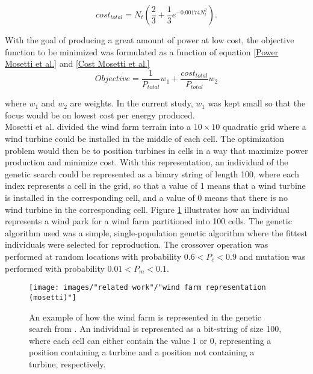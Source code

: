 \begin{equation}
\label{Cost Mosetti et al.}
cost_{total} = N_t \left( \frac{2}{3} + \frac{1}{3}e^{-0.00174N_t^2} \right).
\end{equation}

\noindent With the goal of producing a great amount of power at low cost, the objective function to be minimized was formulated as a function of equation \ref{Power Mosetti et al.} and \ref{Cost Mosetti et al.}\\


\begin{equation}
Objective = \frac{1}{P_{total}}w_1 + \frac{cost_{total}}{P_{total}}w_2
\label{Objective function Mosetti et al.}
\end{equation}


\noindent where $w_1$ and $w_2$ are weights. In the current study, $w_1$ was kept small so that the focus would be on lowest cost per energy produced. \\

\noindent Mosetti et al. divided the wind farm terrain into a $10\times10$ quadratic grid where a wind turbine could be installed in the middle of each cell. The optimization problem would then be to position turbines in cells in a way that maximize power production and minimize cost. With this representation, an individual of the genetic search could be represented as a binary string of length 100, where each index represents a cell in the grid, so that a value of 1 means that a wind turbine is installed in the corresponding cell, and a value of 0 means that there is no wind turbine in the corresponding cell. Figure \ref{Wind Farm Representation} illustrates how an individual represents a wind park for a wind farm partitioned into 100 cells. The genetic algorithm used was a simple, single-population genetic algorithm where the fittest individuals were selected for reproduction. The crossover operation was performed at random locations with probability $0.6 < P_c < 0.9$ and mutation was performed with probability $0.01 < P_m < 0.1$. \\


\begin{figure}[h!]
\begin{center}
\texttt{[image: images/"related work"/"wind farm representation (mosetti)"]}
\caption{An example of how the wind farm is represented in the genetic search from \cite{Mosetti}. An individual is represented as a bit-string of size 100, where each cell can either contain the value 1 or 0, representing a position containing a turbine and a position not containing a turbine, respectively.}
\label{Wind Farm Representation}
\end{center}
\end{figure}


